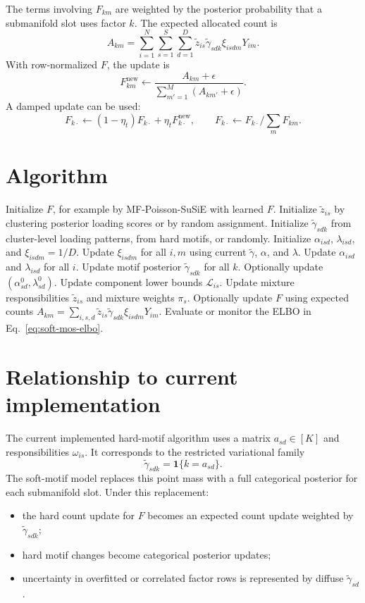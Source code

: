 \documentclass[11pt]{article}
\newcommand{\tg}{\widetilde{\gamma}}
\newcommand{\tz}{\widetilde{z}}
\theoremstyle{definition}
\begin{document}
The terms involving $F_{km}$ are weighted by the posterior probability that a
submanifold slot uses factor $k$. The expected allocated count is
\[
  A_{km}
  =
  \sum_{i=1}^{N}\sum_{s=1}^{S}\sum_{d=1}^{D}
  \tz_{is}\tg_{sdk}\xi_{isdm}Y_{im}.
\]
With row-normalized $F$, the update is
\[
  F_{km}^{\mathrm{new}}
  \leftarrow
  \frac{A_{km}+\epsilon}
       {\sum_{m'=1}^{M}(A_{km'}+\epsilon)}.
\]
A damped update can be used:
\[
  F_{k\cdot}
  \leftarrow
  (1-\eta_t)F_{k\cdot}+\eta_t F^{\mathrm{new}}_{k\cdot},
  \qquad
  F_{k\cdot}\leftarrow F_{k\cdot}/\sum_mF_{km}.
\]

\section{Algorithm}

\begin{algorithm}[H]
\caption{Soft-motif MoS-NMF}
\small
\begin{algorithmic}[1]
\State Initialize $F$, for example by MF-Poisson-SuSiE with learned $F$.
\State Initialize $\tz_{is}$ by clustering posterior loading scores or by
random assignment.
\State Initialize $\tg_{sdk}$ from cluster-level loading patterns, from hard
motifs, or randomly.
\State Initialize $\alpha_{isd}$, $\lambda_{isd}$, and $\xi_{isdm}=1/D$.
      \State Update $\xi_{isdm}$ for all $i,m$ using current $\tg$, $\alpha$,
      and $\lambda$.
      \State Update $\alpha_{isd}$ and $\lambda_{isd}$ for all $i$.
      \State Update motif posterior $\tg_{sdk}$ for all $k$.
      \State Optionally update $(\alpha^0_{sd},\lambda^0_{sd})$.
    \EndFor
  \EndFor
  \State Update component lower bounds $\mathcal{L}_{is}$.
  \State Update mixture responsibilities $\tz_{is}$ and mixture weights $\pi_s$.
  \State Optionally update $F$ using expected counts
  $A_{km}=\sum_{i,s,d}\tz_{is}\tg_{sdk}\xi_{isdm}Y_{im}$.
  \State Evaluate or monitor the ELBO in Eq.~\eqref{eq:soft-mos-elbo}.
\EndFor
\end{algorithmic}
\end{algorithm}

\section{Relationship to current implementation}

The current implemented hard-motif algorithm uses a matrix
$a_{sd}\in[K]$ and responsibilities $\omega_{is}$. It corresponds to the
restricted variational family
\[
  \tg_{sdk}=\mathbf{1}\{k=a_{sd}\}.
\]
The soft-motif model replaces this point mass with a full categorical posterior
for each submanifold slot. Under this replacement:
\begin{itemize}
  \item the hard count update for $F$ becomes an expected count update weighted
  by $\tg_{sdk}$;
  \item hard motif changes become categorical posterior updates;
  \item uncertainty in overfitted or correlated factor rows is represented by
  diffuse $\tg_{sd}$.
\end{itemize}
\end{document}
